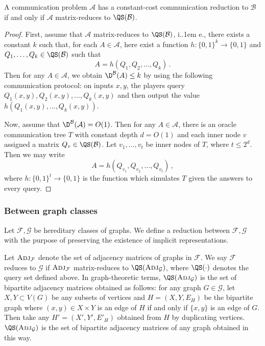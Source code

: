\documentclass{article}
\makeatletter
\newcommand{\zo}{\{0,1\}}
\newcommand{\cA}{\ensuremath{\mathcal{A}}}
\newcommand{\cB}{\ensuremath{\mathcal{B}}}
\newcommand{\cF}{\ensuremath{\mathcal{F}}}
\newcommand{\cG}{\ensuremath{\mathcal{G}}}
\newcommand{\Adj}{\textsc{Adj}}
\newcommand*\ie{i.\kern.1em e.\@\xspace} %
\makeatother
\begin{document}
\begin{proposition}\label{prop:cc-mat-red}
A communication problem $\cA$ has a constant-cost communication reduction to $\cB$ if and only if
$\cA$ matrix-reduces to $\QS(\cB)$.
\end{proposition}
\begin{proof}
First, assume that $\cA$ matrix-reduces to $\QS(\cB)$, \ie, 
there exists a constant $k$ such that, for each $A \in \cA$, 
here exist a function $h : \zo^k \to \zo$ and $Q_1, \dotsc, Q_k \in
\QS(\cB)$ such that
\[
    A = h(Q_1, Q_2, \dotsc, Q_k) \,.
\]
Then for any $A \in \cA$, we obtain $\D^\cB(A) \leq k$ by using the following communication
protocol: on
inputs $x,y$, the players query $Q_1(x,y), Q_2(x,y), \dotsc, Q_k(x,y)$ and then output the value $h(Q_1(x,y), \dotsc, Q_k(x,y))$.

Now, assume that $\D^\cB(\cA) = O(1)$. Then for any $A \in \cA$, there is an oracle communication
tree $T$ with constant depth $d = O(1)$ and each inner node $v$ assigned a matrix $Q_v \in
\QS(\cB)$. Let $v_1, \dotsc, v_t$ be inner nodes of $T$, where $t \leq 2^d$. Then we may write
\[
  A = h(Q_{v_1}, Q_{v_2}, \dotsc, Q_{v_t}) \,,
\]
where $h : \zo^t \to \zo$ is the function which simulates $T$ given the answers to every query.
\end{proof}

\subsubsection{Between graph classes}
\label{section:graph-class-reductions}

Let $\cF, \cG$ be hereditary classes of graphs. We define a reduction between $\cF, \cG$ with the
purpose of preserving the existence of implicit representations.

Let $\Adj_\cF$ denote the set of adjacency matrices of graphs in $\cF$.  We say $\cF$ reduces to
$\cG$ if $\Adj_\cF$ matrix-reduces to $\QS(\Adj_\cG)$, where $\QS(\cdot)$ denotes the query set
defined above. In graph-theoretic terms, $\QS(\Adj_\cG)$ is the set of bipartite adjacency matrices
obtained as follows: for any graph $G \in \cG$, let $X, Y \subset V(G)$ be any subsets of vertices
and $H = (X,Y,E_H)$ be the bipartite graph where $(x,y) \in X \times Y$ is an edge of $H$ if and only if 
$\{x,y\}$ is an edge of $G$. Then take any $H' = (X',Y',E'_H)$ obtained from $H$ by duplicating vertices. $\QS(\Adj_\cG)$
is the set of bipartite adjacency matrices of any graph obtained in this way.
\end{document}
